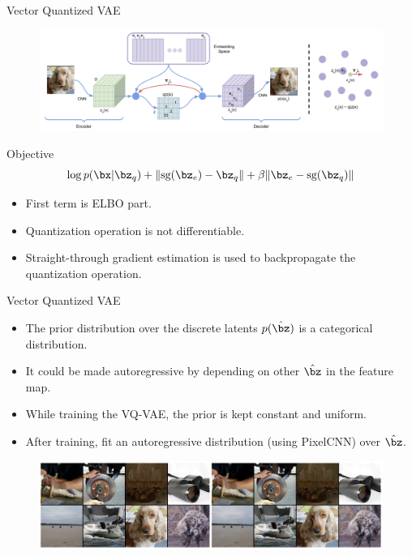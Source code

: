 \begin{frame}{Vector Quantized VAE}
	\begin{figure}
		\centering
		\includegraphics[width=\linewidth]{figs/vqvae}
	\end{figure}
	\begin{block}{Objective}
		\vspace{-0.3cm}
		\[
			\log p(\bx | \bz_q) + \| \text{sg} (\bz_e) - \bz_q \| + \beta \| \bz_e - \text{sg}(\bz_q) \|
		\]
	\end{block}
	\begin{itemize}
		\item First term is ELBO part.
		\item Quantization operation is not differentiable.
		\item Straight-through gradient estimation is used to backpropagate the quantization operation.
	\end{itemize}

\end{frame}
\begin{frame}{Vector Quantized VAE}
	\begin{itemize}
		\item The prior distribution over the discrete latents $p(\hat{\bz})$ is a categorical distribution.
		\item It could be made autoregressive by depending on other $\hat{\bz}$ in the feature map. 
		\item While training the VQ-VAE, the prior is kept constant and uniform. 
		\item After training, fit an autoregressive distribution (using PixelCNN) over $\hat{\bz}$.
	\end{itemize}
	\begin{figure}
		\centering
		\includegraphics[width=\linewidth]{figs/vqvae_results}
	\end{figure}

\end{frame}
